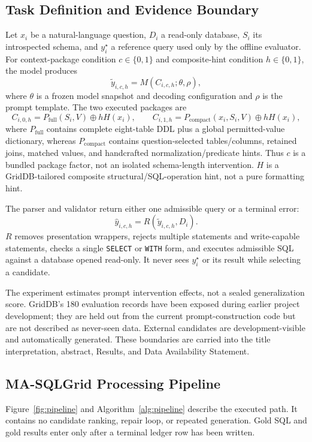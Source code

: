 \documentclass[applsci,article,submit,moreauthors]{Definitions/mdpi}
\newcommand{\masql}{MA-SQLGrid}
\begin{document}
\subsection{Task Definition and Evidence Boundary}
Let $x_i$ be a natural-language question, $D_i$ a read-only database, $S_i$ its introspected schema, and $y_i^\star$ a reference query used only by the offline evaluator. For context-package condition $c\in\{0,1\}$ and composite-hint condition $h\in\{0,1\}$, the model produces
\begin{equation}
\widetilde y_{i,c,h}=M(C_{i,c,h};\theta,\rho),
\end{equation}
where $\theta$ is a frozen model snapshot and decoding configuration and $\rho$ is the prompt template. The two executed packages are
\begin{equation}
C_{i,0,h}=P_{\mathrm{full}}(S_i,V)\oplus hH(x_i),\qquad
C_{i,1,h}=P_{\mathrm{compact}}(x_i,S_i,V)\oplus hH(x_i),
\end{equation}
where $P_{\mathrm{full}}$ contains complete eight-table DDL plus a global permitted-value dictionary, whereas $P_{\mathrm{compact}}$ contains question-selected tables/columns, retained joins, matched values, and handcrafted normalization/predicate hints. Thus $c$ is a bundled package factor, not an isolated schema-length intervention. $H$ is a GridDB-tailored composite structural/SQL-operation hint, not a pure formatting hint.

The parser and validator return either one admissible query or a terminal error:
\begin{equation}
\widehat y_{i,c,h}=R(\widetilde y_{i,c,h},D_i).
\end{equation}
$R$ removes presentation wrappers, rejects multiple statements and write-capable statements, checks a single \texttt{SELECT} or \texttt{WITH} form, and executes admissible SQL against a database opened read-only. It never sees $y_i^\star$ or its result while selecting a candidate.

The experiment estimates prompt intervention effects, not a sealed generalization score. GridDB's 180 evaluation records have been exposed during earlier project development; they are held out from the current prompt-construction code but are not described as never-seen data. External candidates are development-visible and automatically generated. These boundaries are carried into the title interpretation, abstract, Results, and Data Availability Statement.

\subsection{\masql{} Processing Pipeline}
Figure~\ref{fig:pipeline} and Algorithm~\ref{alg:pipeline} describe the executed path. It contains no candidate ranking, repair loop, or repeated generation. Gold SQL and gold results enter only after a terminal ledger row has been written.
\end{document}

